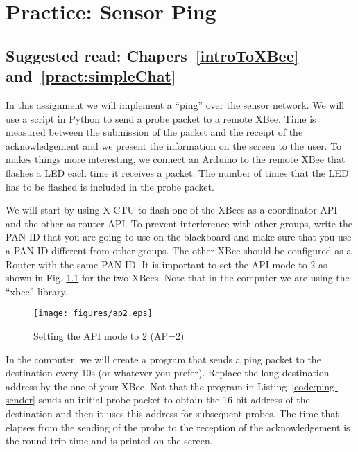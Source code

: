 \chapter{Practice: Sensor Ping}
\section*{Suggested read: Chapers~\ref{introToXBee} and~\ref{pract:simpleChat}}

In this assignment we will implement a ``ping'' over the sensor network.
We will use a script in Python to send a probe packet to a remote XBee.
Time is measured between the submission of the packet and the receipt of the acknowledgement and we present the information on the screen to the user.
To makes things more interesting, we connect an Arduino to the remote XBee that flashes a LED each time it receives a packet.
The number of times that the LED has to be flashed is included in the probe packet.

We will start by using X-CTU to flash one of the XBees as a coordinator API and the other as router API.
To prevent interference with other groups, write the PAN ID that you are going to use on the blackboard and make sure that you use a PAN ID different from other groups.
The other XBee should be configured as a Router with the same PAN ID.
It is important to set the API mode to 2 as shown in Fig. \ref{fig:ap2} for the two XBees.
Note that in the computer we are using the ``xbee'' library.


\begin{figure}[htbp]
  \centering
  \texttt{[image: figures/ap2.eps]}
  \caption{Setting the API mode to 2 (AP=2)}
  \label{fig:ap2}
\end{figure}

In the computer, we will create a program that sends a ping packet to the destination every 10s (or whatever you prefer).
Replace the long destination address by the one of your XBee.
Not that the program in Listing~\ref{code:ping-sender} sends an initial probe packet to obtain the 16-bit address of the destination and then it uses this address for subsequent probes.
The time that elapses from the sending of the probe to the reception of the acknowledgement is the round-trip-time and is printed on the screen.

